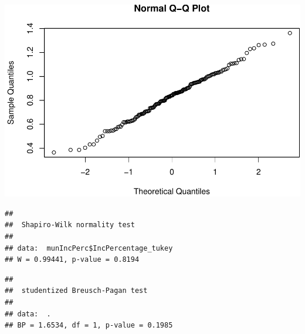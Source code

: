 \documentclass[11pt,]{article}
\newenvironment{Shaded}{\begin{snugshade}}{\end{snugshade}}
\newcommand{\KeywordTok}[1]{\textcolor[rgb]{0.13,0.29,0.53}{\textbf{#1}}}
\newcommand{\StringTok}[1]{\textcolor[rgb]{0.31,0.60,0.02}{#1}}
\newcommand{\OperatorTok}[1]{\textcolor[rgb]{0.81,0.36,0.00}{\textbf{#1}}}
\newcommand{\NormalTok}[1]{#1}
\begin{document}
\includegraphics{proyecto_files/figure-latex/unnamed-chunk-22-3.pdf}

\begin{Shaded}
\end{Shaded}

\begin{verbatim}
## 
##  Shapiro-Wilk normality test
## 
## data:  munIncPerc$IncPercentage_tukey
## W = 0.99441, p-value = 0.8194
\end{verbatim}

\begin{Shaded}
\end{Shaded}

\begin{verbatim}
## 
##  studentized Breusch-Pagan test
## 
## data:  .
## BP = 1.6534, df = 1, p-value = 0.1985
\end{verbatim}

\begin{Shaded}
\end{Shaded}
\end{document}
